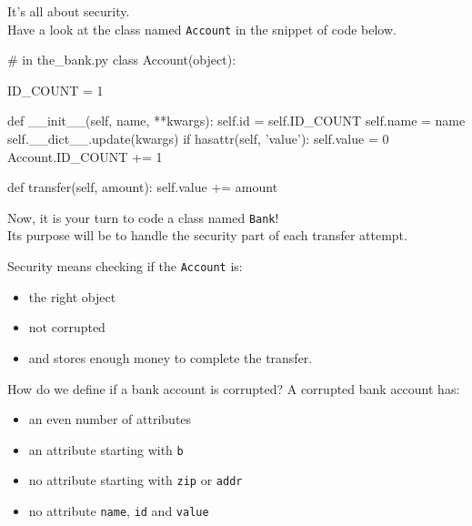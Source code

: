 \documentclass[]{article}
\newenvironment{Shaded}{\begin{snugshade}}{\end{snugshade}}
\newcommand{\BuiltInTok}[1]{\textcolor[rgb]{0.50,0.55,0.55}{#1}}
\newcommand{\CommentTok}[1]{\textcolor[rgb]{0.48,0.49,0.49}{#1}}
\newcommand{\ControlFlowTok}[1]{\textcolor[rgb]{0.99,0.74,0.29}{#1}}
\newcommand{\DecValTok}[1]{\textcolor[rgb]{0.96,0.45,0.00}{#1}}
\newcommand{\FunctionTok}[1]{\textcolor[rgb]{0.56,0.27,0.68}{#1}}
\newcommand{\KeywordTok}[1]{\textcolor[rgb]{0.81,0.81,0.76}{#1}}
\newcommand{\NormalTok}[1]{\textcolor[rgb]{0.81,0.81,0.76}{#1}}
\newcommand{\OperatorTok}[1]{\textcolor[rgb]{0.81,0.81,0.76}{#1}}
\newcommand{\StringTok}[1]{\textcolor[rgb]{0.96,0.31,0.31}{#1}}
\newcommand{\VariableTok}[1]{\textcolor[rgb]{0.15,0.68,0.68}{#1}}
\begin{document}
It's all about security.\\
Have a look at the class named \texttt{Account} in the snippet of code
below.

\begin{Shaded}
\begin{Highlighting}[]
\CommentTok{# in the_bank.py}
\KeywordTok{class}\NormalTok{ Account(}\BuiltInTok{object}\NormalTok{):}

\NormalTok{    ID_COUNT }\OperatorTok{=} \DecValTok{1}

    \KeywordTok{def} \FunctionTok{__init__}\NormalTok{(}\VariableTok{self}\NormalTok{, name, }\OperatorTok{**}\NormalTok{kwargs):}
        \VariableTok{self}\NormalTok{.}\BuiltInTok{id} \OperatorTok{=} \VariableTok{self}\NormalTok{.ID_COUNT}
        \VariableTok{self}\NormalTok{.name }\OperatorTok{=}\NormalTok{ name}
        \VariableTok{self}\NormalTok{.__dict__.update(kwargs)}
        \ControlFlowTok{if} \BuiltInTok{hasattr}\NormalTok{(}\VariableTok{self}\NormalTok{, }\StringTok{'value'}\NormalTok{):}
            \VariableTok{self}\NormalTok{.value }\OperatorTok{=} \DecValTok{0}
\NormalTok{        Account.ID_COUNT }\OperatorTok{+=} \DecValTok{1}
    
    \KeywordTok{def}\NormalTok{ transfer(}\VariableTok{self}\NormalTok{, amount):}
        \VariableTok{self}\NormalTok{.value }\OperatorTok{+=}\NormalTok{ amount}
\end{Highlighting}
\end{Shaded}

Now, it is your turn to code a class named \texttt{Bank}!\\
Its purpose will be to handle the security part of each transfer
attempt.

Security means checking if the \texttt{Account} is:

\begin{itemize}
\item
  the right object
\item
  not corrupted
\item
  and stores enough money to complete the transfer.
\end{itemize}

How do we define if a bank account is corrupted? A corrupted bank
account has:

\begin{itemize}
\item
  an even number of attributes
\item
  an attribute starting with \texttt{b}
\item
  no attribute starting with \texttt{zip} or \texttt{addr}
\item
  no attribute \texttt{name}, \texttt{id} and \texttt{value}
\end{itemize}
\end{document}
